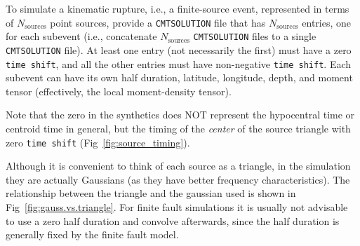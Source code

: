 \label{To-simulate-a}To simulate a kinematic rupture, i.e., a finite-source
event, represented in terms of $N_{\mathrm{sources}}$ point sources,
provide a \texttt{CMTSOLUTION} file that has $N_{\mathrm{sources}}$
entries, one for each subevent (i.e., concatenate $N_{\mathrm{sources}}$
\texttt{CMTSOLUTION} files to a single \texttt{CMTSOLUTION} file).
At least one entry (not necessarily the first) must have a zero \texttt{time
shift}, and all the other entries must have non-negative \texttt{time
shift}. Each subevent can have its own half duration, latitude, longitude,
depth, and moment tensor (effectively, the local moment-density tensor).

Note that the zero in the synthetics does NOT represent the hypocentral
time or centroid time in general, but the timing of the \textit{center}
of the source triangle with zero \texttt{time shift} (Fig~\ref{fig:source_timing}).

Although it is convenient to think of each source as a triangle, in
the simulation they are actually Gaussians (as they have better frequency
characteristics). The relationship between the triangle and the gaussian
used is shown in Fig~\ref{fig:gauss.vs.triangle}. For finite fault
simulations it is usually not advisable to use a zero half duration
and convolve afterwards, since the half duration is generally fixed
by the finite fault model.

\vspace{1cm}


